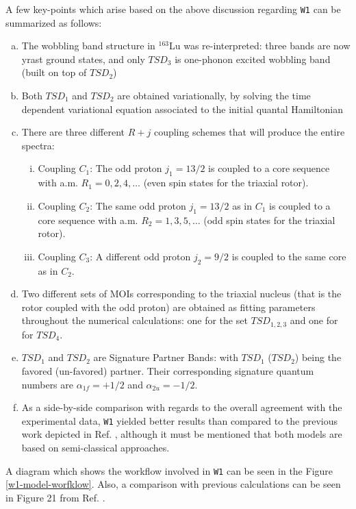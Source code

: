 \documentclass[11pt]{article}
\begin{document}
A few key-points which arise based on the above discussion regarding \texttt{W1} can be summarized as follows:

\begin{enumerate}[(a)]
    \item The wobbling band structure in $^{163}$Lu was re-interpreted: three bands are now yrast ground states, and only $TSD_3$ is one-phonon excited wobbling band (built on top of $TSD_2$)
    \item Both $TSD_1$ and $TSD_2$ are obtained variationally, by solving the time dependent variational equation associated to the initial quantal Hamiltonian
    \item There are three different $R+j$ coupling schemes that will produce the entire spectra:
    \begin{enumerate}[(i)]
        \item Coupling $C_1$: The odd proton $j_1={13/2}$ is coupled to a core sequence with a.m. $R_1=0,2,4,\dots$ (even spin states for the triaxial rotor).
        \item Coupling $C_2$: The same odd proton $j_1={13/2}$ as in $C_1$ is coupled to a core sequence with a.m. $R_2=1,3,5,\dots$ (odd spin states for the triaxial rotor).
        \item Coupling $C_3$: A different odd proton $j_2={9/2}$ is coupled to the same core as in $C_2$.
    \end{enumerate}
    \item Two different sets of MOIs corresponding to the triaxial nucleus (that is the rotor coupled with the odd proton) are obtained as fitting parameters throughout the numerical calculations: one for the set $TSD_{1,2,3}$ and one for for $TSD_4$.
    \item $TSD_1$ and $TSD_2$ are Signature Partner Bands: with $TSD_1$ ($TSD_2$) being the favored (un-favored) partner. Their corresponding signature quantum numbers are $\alpha_{1f}=+1/2$ and $\alpha_{2u}=-1/2$.
    \item As a side-by-side comparison with regards to the overall agreement with the experimental data, \texttt{W1} yielded better results than compared to the previous work depicted in Ref. \cite{raduta2007semiclassical}, although it must be mentioned that both models are based on semi-classical approaches.
\end{enumerate}

A diagram which shows the workflow involved in \texttt{W1} can be seen in the Figure \ref{w1-model-worfklow}. Also, a comparison with previous calculations can be seen in Figure 21 from Ref. \cite{raduta2020approach}.
\end{document}
